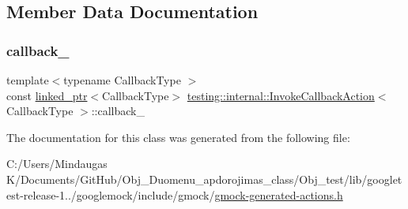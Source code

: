 \subsection{Member Data Documentation}
\mbox{\label{classtesting_1_1internal_1_1_invoke_callback_action_ac9d602c5a1a39b130fd68906c2e3296d}} 
\subsubsection{\texorpdfstring{callback\_}{callback\_}}
{\footnotesize\ttfamily template$<$typename Callback\+Type $>$ \\
const \mbox{\hyperlink{classtesting_1_1internal_1_1linked__ptr}{linked\+\_\+ptr}}$<$Callback\+Type$>$ \mbox{\hyperlink{classtesting_1_1internal_1_1_invoke_callback_action}{testing\+::internal\+::\+Invoke\+Callback\+Action}}$<$ Callback\+Type $>$\+::callback\+\_\+\hspace{0.3cm}{\ttfamily [private]}}



The documentation for this class was generated from the following file\+:\begin{DoxyCompactItemize}
\item 
C\+:/\+Users/\+Mindaugas K/\+Documents/\+Git\+Hub/\+Obj\+\_\+\+Duomenu\+\_\+apdorojimas\+\_\+class/\+Obj\+\_\+test/lib/googletest-\/release-\/1../googlemock/include/gmock/\mbox{\hyperlink{_obj__test_2lib_2googletest-release-1_88_81_2googlemock_2include_2gmock_2gmock-generated-actions_8h}{gmock-\/generated-\/actions.\+h}}\end{DoxyCompactItemize}
